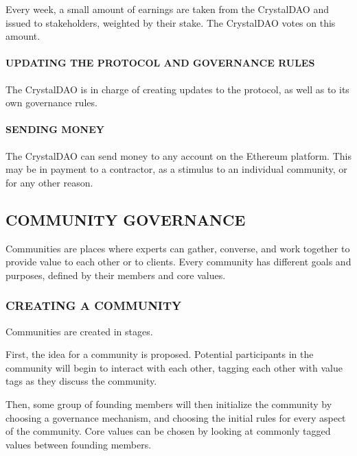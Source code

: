 Every week, a small amount of earnings are taken from the CrystalDAO and
issued to stakeholders, weighted by their stake. The CrystalDAO votes on
this amount.

\paragraph{UPDATING THE PROTOCOL AND GOVERNANCE
RULES}\label{updating-the-protocol-and-governance-rules}

The CrystalDAO is in charge of creating updates to the protocol, as well
as to its own governance rules.

\paragraph{SENDING MONEY}\label{sending-money}

The CrystalDAO can send money to any account on the Ethereum platform.
This may be in payment to a contractor, as a stimulus to an individual
community, or for any other reason.

\subsection{\texorpdfstring{\protect\hypertarget{_lyyxpmxrcjhi}{}{\protect\hypertarget{_Toc462050428}{}{}}COMMUNITY
GOVERNANCE}{COMMUNITY GOVERNANCE}}\label{community-governance}

Communities are places where experts can gather, converse, and work
together to provide value to each other or to clients. Every community
has different goals and purposes, defined by their members and core
values.

\subsubsection{\texorpdfstring{\protect\hypertarget{_p757pudolk1d}{}{\protect\hypertarget{_Toc462050429}{}{}}CREATING
A COMMUNITY}{CREATING A COMMUNITY}}\label{creating-a-community}

Communities are created in stages.

First, the idea for a community is proposed. Potential participants in
the community will begin to interact with each other, tagging each other
with value tags as they discuss the community.

Then, some group of founding members will then initialize the community
by choosing a governance mechanism, and choosing the initial rules for
every aspect of the community. Core values can be chosen by looking at
commonly tagged values between founding members.

